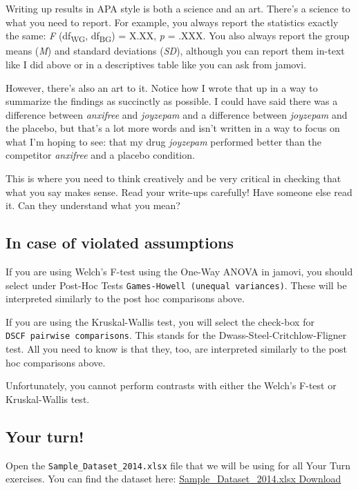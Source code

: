 \documentclass[
]{book}
\begin{document}
Writing up results in APA style is both a science and an art. There's a science to what you need to report. For example, you always report the statistics exactly the same: \emph{F} (df\textsubscript{WG}, df\textsubscript{BG}) = X.XX, \emph{p} = .XXX. You also always report the group means (\emph{M}) and standard deviations (\emph{SD}), although you can report them in-text like I did above or in a descriptives table like you can ask from jamovi.

However, there's also an art to it. Notice how I wrote that up in a way to summarize the findings as succinctly as possible. I could have said there was a difference between \emph{anxifree} and \emph{joyzepam} and a difference between \emph{joyzepam} and the placebo, but that's a lot more words and isn't written in a way to focus on what I'm hoping to see: that my drug \emph{joyzepam} performed better than the competitor \emph{anxifree} and a placebo condition.

This is where you need to think creatively and be very critical in checking that what you say makes sense. Read your write-ups carefully! Have someone else read it. Can they understand what you mean?

\hypertarget{in-case-of-violated-assumptions-5}{%
\subsection{In case of violated assumptions}\label{in-case-of-violated-assumptions-5}}

If you are using Welch's F-test using the One-Way ANOVA in jamovi, you should select under Post-Hoc Tests \texttt{Games-Howell\ (unequal\ variances)}. These will be interpreted similarly to the post hoc comparisons above.

If you are using the Kruskal-Wallis test, you will select the check-box for \texttt{DSCF\ pairwise\ comparisons}. This stands for the Dwass-Steel-Critchlow-Fligner test. All you need to know is that they, too, are interpreted similarly to the post hoc comparisons above.

Unfortunately, you cannot perform contrasts with either the Welch's F-test or Kruskal-Wallis test.

\hypertarget{your-turn-6}{%
\subsection{Your turn!}\label{your-turn-6}}

Open the \texttt{Sample\_Dataset\_2014.xlsx} file that we will be using for all Your Turn exercises. You can find the dataset here: \href{https://github.com/danawanzer/stats-with-jamovi/blob/master/data/Sample_Dataset_2014.xlsx}{Sample\_Dataset\_2014.xlsx Download}
\end{document}
